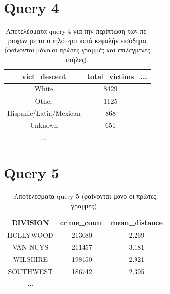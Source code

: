 \documentclass[a4paper,12pt]{article}
\begin{document}
\begin{otherlanguage}{greek}
\section*{Query 4}
	\lipsum[4] %
	\FloatBarrier
	\begin{table}[h]
		\centering
		\begin{tabular}{ccc}
			vict\_descent & total\_victims & ... \\
			\hline
			White & 8429 & \\
			Other & 1125 & \\
			Hispanic/Latin/Mexican & 868 & \\
			Unknown & 651 & \\
			...
		\end{tabular}
		\caption{Aποτελέσματα query 4 για την περίπτωση των
		περιοχών με το υψηλότερο κατά κεφαλήν εισόδημα 
		(φαίνονται μόνο οι 
		πρώτες γραμμές και επιλεγμένες στήλες).}
	\end{table}
	\FloatBarrier

\section*{Query 5}
	\lipsum[5] %
	\FloatBarrier
	\begin{table}[h]
		\centering
		\begin{tabular}{ccc}
			DIVISION & crime\_count & mean\_distance \\
			\hline
			HOLLYWOOD & 213080 & 2.269 \\
			VAN NUYS & 211457 & 3.181 \\
			WILSHIRE & 198150 & 2.921 \\
			SOUTHWEST & 186742 & 2.395 \\
			...
		\end{tabular}
		\caption{Aποτελέσματα query 5 (φαίνονται μόνο οι 
		πρώτες γραμμές).}
	\end{table}
	\FloatBarrier

\FloatBarrier
\printbibliography

\end{otherlanguage}
\end{document}
